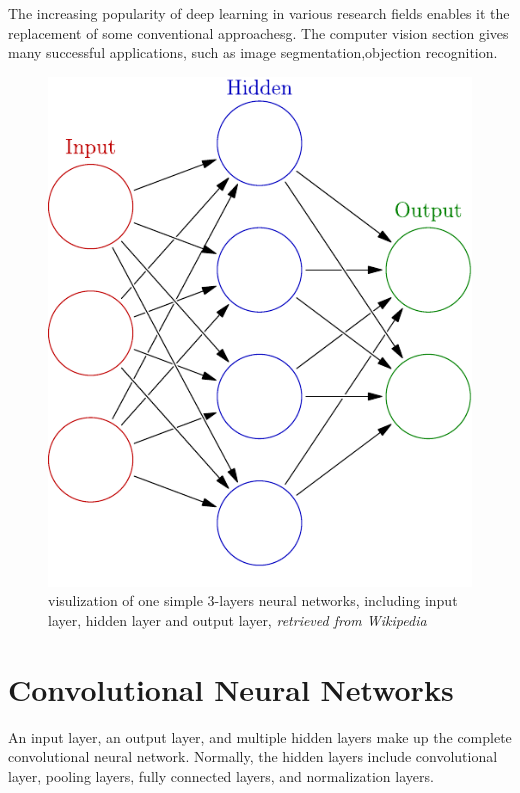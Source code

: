     The increasing popularity of deep learning in various research fields enables it the replacement of some conventional approachesg. The computer vision section gives many successful applications, such as image segmentation\cite{lecun2015deep},objection recognition\cite{he2016deep}.
     \begin{figure}[!ht]
        \centering
        \includegraphics[scale = 0.5]{Figures/Colored_neural_network}
        \caption{visulization of one simple $3$-layers neural networks, including input layer, hidden layer and output layer, \textit{retrieved from Wikipedia}}
    \end{figure}

\section{Convolutional Neural Networks}
    \label{cnn}
    An input layer, an output layer, and multiple hidden layers make up the complete convolutional neural network. Normally, the hidden layers include convolutional layer, pooling layers, fully connected layers, and normalization layers. 

